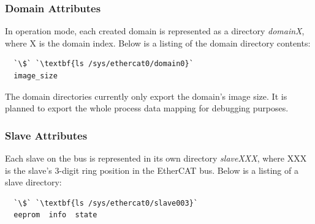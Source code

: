 \documentclass[a4paper,12pt,BCOR6mm,bibtotoc,idxtotoc]{scrbook}
\begin{document}
\subsubsection{Domain Attributes}
\label{sec:sysfs-domain}

In operation mode, each created domain is represented as a directory
\textit{domainX}, where X is the domain index. Below is a listing of
the domain directory contents:

\begin{lstlisting}
  `\$` `\textbf{ls /sys/ethercat0/domain0}`
  image_size
\end{lstlisting}

The domain directories currently only export the domain's image size.
It is planned to export the whole process data mapping for debugging
purposes.

\subsubsection{Slave Attributes}
\label{sec:sysfs-slave}

Each slave on the bus is represented in its own directory
\textit{slaveXXX}, where XXX is the slave's 3-digit ring position in
the EtherCAT bus. Below is a listing of a slave directory:

\begin{lstlisting}
  `\$` `\textbf{ls /sys/ethercat0/slave003}`
  eeprom  info  state
\end{lstlisting}
\end{document}
